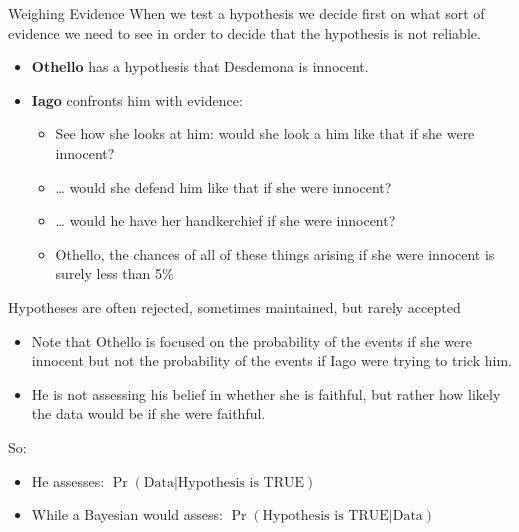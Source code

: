 \documentclass[
  11pt,
  ignorenonframetext,
]{beamer}
\providecommand{\tightlist}{%
  \setlength{\itemsep}{0pt}\setlength{\parskip}{0pt}}\usepackage{longtable,booktabs,array}
\begin{document}
\begin{frame}{Weighing Evidence}
\protect\hypertarget{weighing-evidence}{}
When we test a hypothesis we decide first on what sort of evidence we
need to see in order to decide that the hypothesis is not reliable.

\begin{itemize}
\item
  \textbf{Othello} has a hypothesis that Desdemona is innocent.
\item
  \textbf{Iago} confronts him with evidence:

  \begin{itemize}
  \tightlist
  \item
    See how she looks at him: would she look a him like that if she were
    innocent?
  \item
    \ldots{} would she defend him like that if she were innocent?
  \item
    \ldots{} would he have her handkerchief if she were innocent?
  \item
    Othello, the chances of all of these things arising if she were
    innocent is surely less than 5\%
  \end{itemize}
\end{itemize}
\end{frame}

\begin{frame}{Hypotheses are often rejected, sometimes maintained, but
rarely accepted}
\protect\hypertarget{hypotheses-are-often-rejected-sometimes-maintained-but-rarely-accepted}{}
\begin{itemize}
\item
  Note that Othello is focused on the probability of the events if she
  were innocent but not the probability of the events if Iago were
  trying to trick him.
\item
  He is not assessing his belief in whether she is faithful, but rather
  how likely the data would be if she were faithful.
\end{itemize}

So:

\begin{itemize}
\tightlist
\item
  He assesses: \(\Pr(\text{Data} | \text{Hypothesis is TRUE})\)
\item
  While a Bayesian would assess:
  \(\Pr(\text{Hypothesis is TRUE} | \text{Data})\)
\end{itemize}
\end{frame}
\end{document}
